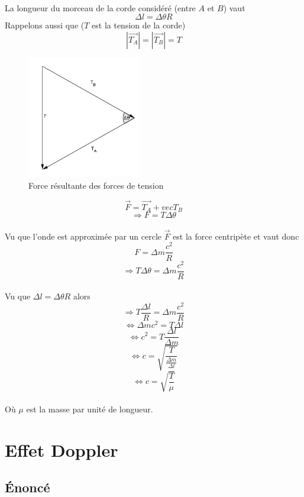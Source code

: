 \documentclass[a4paper]{article}
\begin{document}
\paragraph{}La longueur du morceau de la corde considéré (entre $A$ et $B$) vaut
\[\Delta l=\Delta \theta R\]
Rappelons aussi que ($T$ est la tension de la corde)
\[\left|\vec{T_A}\right|=\left|\vec{T_B}\right|=T\]
\begin{figure}
\begin{center}
\includegraphics[width=5cm]{imgs/result.png}
\end{center}
\caption{Force résultante des forces de tension}
\label{Force résultante des forces de tension}
\end{figure}
\[\vec{F}=\vec{T_A}+vec{T_B}\]
\[\Rightarrow F=T\Delta\theta\]
\paragraph{}Vu que l'onde est approximée par un cercle $\vec{F}$ est la force centripète et vaut donc
\[F=\Delta m \frac{c^2}{R}\]
\[\Rightarrow T\Delta \theta=\Delta m \frac{c^2}{R}\]
\paragraph{}Vu que $\Delta l=\Delta \theta R$ alors
\[\Rightarrow T\frac{\Delta l}{R}=\Delta m \frac{c^2}{R}\]
\[\Leftrightarrow \Delta m c^2=T\Delta l\]
\[\Leftrightarrow c^2=T\frac{\Delta l}{\Delta m}\]
\[\Leftrightarrow c=\sqrt{\frac{T}{\frac{\Delta m}{\Delta l}}}\]
\[\Leftrightarrow c=\sqrt{\frac{T}{\mu}}\]
\paragraph{}Où $\mu$ est la masse par unité de longueur.
\section{Effet Doppler}
\subsection{Énoncé}
\end{document}
